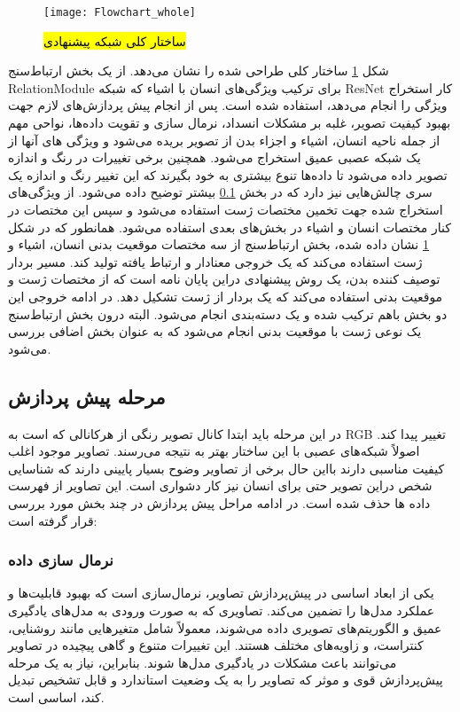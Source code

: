 \begin{figure}[ht]
	\centerline{\texttt{[image: Flowchart\_whole]}}
	\caption{
	\hl{ساختار کلی شبکه پیشنهادی}
	}
	\label{fig:Flowchart_whole}
\end{figure}
شکل %
\ref{fig:Flowchart_whole}
ساختار کلی طراحی شده را نشان می‌دهد. از یک بخش ارتباط‌سنج %
\gls{RelationModule}
برای ترکیب ویژگی‌های انسان با اشیاء که شبکه ResNet کار استخراج ویژگی را انجام می‌دهد،‌ استفاده شده است. 
پس از انجام پیش‌ پردازش‌های لازم جهت بهبود کیفیت تصویر، غلبه بر مشکلات انسداد، نرمال سازی و تقویت داده‌ها، نواحی مهم از جمله ناحیه انسان، اشیاء و اجزاء بدن از تصویر بریده می‌شود و ویژگی های آنها از یک شبکه عصبی عمیق استخراج می‌شود. همچنین برخی تغییرات در رنگ و اندازه تصویر داده می‌شود تا داده‌ها تنوع بیشتری به خود بگیرند که این تغییر رنگ و اندازه یک سری چالش‌هایی نیز دارد که در بخش %
\ref{pishe_pishnehadi}
بیشتر توضیح داده می‌شود.
از ویژگی‌های استخراج شده جهت تخمین مختصات ژست استفاده می‌شود و سپس این مختصات در کنار مختصات انسان و اشیاء در بخش‌های بعدی استفاده می‌شود. همانطور که در شکل %
\ref{fig:Flowchart_whole}
نشان داده شده، بخش ارتباط‌سنج از سه مختصات موقعیت بدنی انسان، اشیاء و ژست استفاده می‌کند که یک خروجی معنادار و ارتباط‌ یافته تولید کند. مسیر بردار توصیف کننده بدن، یک روش پیشنهادی دراین پایان نامه است که از مختصات ژست و موقعیت بدنی استفاده می‌کند که یک بردار از ژست تشکیل دهد. در ادامه خروجی این دو بخش باهم ترکیب شده و یک دسته‌بندی انجام می‌شود.
البته درون بخش ارتباط‌سنج یک نوعی ژست با موقعیت بدنی ‌انجام می‌شود که به عنوان بخش اضافی بررسی می‌شود.

\subsection{مرحله پیش پردازش}\label{pishe_pishnehadi}

در این مرحله باید ابتدا کانال تصویر رنگی از هرکانالی که است به RGB تغییر پیدا کند. اصولاً شبکه‌های عصبی با این ساختار بهتر به نتیجه می‌رسند. تصاویر موجود اغلب کیفیت مناسبی دارند بااین حال برخی از تصاویر وضوح بسیار پایینی دارند که شناسایی شخص دراین تصویر حتی برای انسان نیز کار دشواری است. این تصاویر از فهرست داده ها حذف شده است.
در ادامه مراحل پیش پردازش در چند بخش مورد بررسی قرار گرفته است:
\subsubsection{نرمال سازی داده}

یکی از ابعاد اساسی در پیش‌پردازش تصاویر، نرمال‌سازی است که بهبود قابلیت‌ها و عملکرد مدل‌ها را تضمین می‌کند. تصاویری که به صورت ورودی به مدل‌های یادگیری عمیق و الگوریتم‌های تصویری داده می‌شوند، معمولاً شامل متغیرهایی مانند روشنایی، کنتراست، و زاویه‌های مختلف هستند. این تغییرات متنوع و گاهی پیچیده در تصاویر می‌توانند باعث مشکلات در یادگیری مدل‌ها شوند. بنابراین، نیاز به یک مرحله پیش‌پردازش قوی و موثر که تصاویر را به یک وضعیت استاندارد و قابل تشخیص تبدیل کند، اساسی است.

